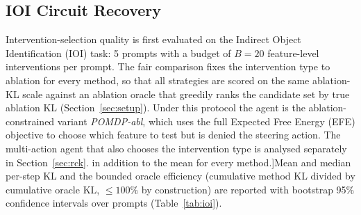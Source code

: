 
\subsection{IOI Circuit Recovery}

Intervention-selection quality is first evaluated on the Indirect Object
Identification (IOI) task: 5 prompts with a budget of $B=20$
feature-level interventions per prompt.  The fair comparison fixes the
intervention type to ablation for every method, so that all
strategies are scored on the same ablation-KL scale against an
ablation oracle that greedily ranks the candidate set by true ablation
KL (Section~\ref{sec:setup}).  Under this protocol the agent is the
ablation-constrained variant \emph{POMDP-abl}, which uses the full
Expected Free Energy (EFE) objective to choose which feature to
test but is denied the steering action.  The multi-action agent that
also chooses the intervention type is analysed separately in
Section~\ref{sec:rck}.  \RtwoHl[R2 minor (Table 2): high coefficient of variation; report median and quartiles. Resolved: Table 2 now reports per-prompt median and inter-quartile range [Q1, Q3] in addition to the mean for every method.]{Mean and median per-step KL and the
bounded oracle efficiency (cumulative method KL divided by
cumulative oracle KL, $\leq 100\%$ by construction) are reported with bootstrap
95\% confidence intervals over prompts (Table~\ref{tab:ioi}).}

